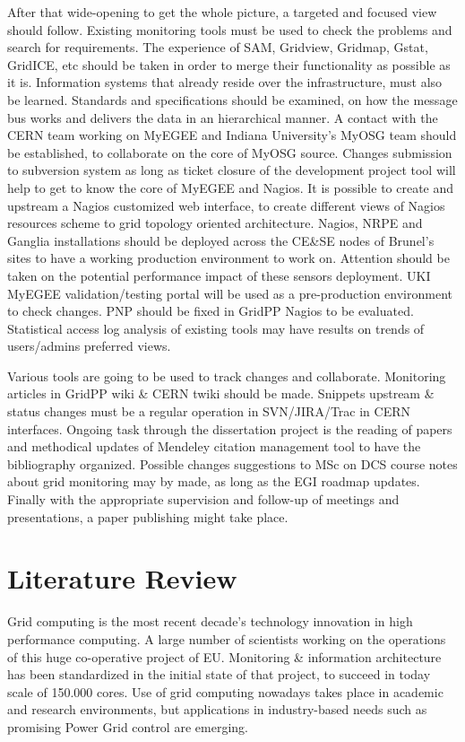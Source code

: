 After that wide-opening to get the whole picture, a targeted and focused view should follow. Existing monitoring tools must be used to check the problems and search for requirements. The experience of SAM, Gridview, Gridmap, Gstat, GridICE, etc should be taken in order to merge their functionality as possible as it is. Information systems that already reside over the infrastructure, must also be learned. Standards and specifications should be examined, on how the message bus works and delivers the data in an hierarchical manner. A contact with the CERN team working on MyEGEE and Indiana University's MyOSG team should be established, to collaborate on the core of MyOSG source. Changes submission to subversion system as long as ticket closure of the development project tool will help to get to know the core of MyEGEE and Nagios. It is possible to create and upstream a Nagios customized web interface, to create different views of Nagios resources scheme to grid topology oriented architecture. Nagios, NRPE and Ganglia installations should be deployed across the CE\&SE nodes of Brunel's sites to have a working production environment to work on. Attention should be taken on the potential performance impact of these sensors deployment. UKI MyEGEE validation/testing portal will be used as a pre-production environment to check changes. PNP should be fixed in GridPP Nagios to be evaluated. Statistical access log analysis of existing tools may have results on trends of users/admins preferred views.

Various tools are going to be used to track changes and collaborate. Monitoring articles in GridPP wiki \& CERN twiki should be made. Snippets upstream \& status changes must be a regular operation in SVN/JIRA/Trac in CERN interfaces. Ongoing task through the dissertation project is the reading of papers and methodical updates of Mendeley citation management tool to have the bibliography organized. Possible changes suggestions to MSc on DCS course notes about grid monitoring may by made, as long as the EGI roadmap updates. Finally with the appropriate supervision and follow-up of meetings and presentations, a paper publishing might take place.

\section{Literature Review}

Grid computing \cite{li2005grid} is the most recent decade's technology innovation in high performance computing. A large number of scientists working on the operations of this huge co-operative project of EU. Monitoring \& information architecture \cite{fisher2002datagrid} has been standardized in the initial state of that project, to succeed in today scale of 150.000 cores. Use of grid computing nowadays takes place in academic and research environments, but applications in industry-based needs such as promising Power Grid control \cite{Taylor2006} are emerging.

